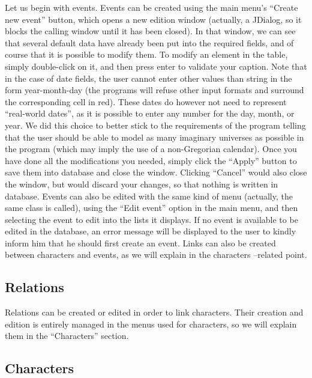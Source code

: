 \documentclass[a4paper ,12pt,french]{article}
\begin{document}
Let us begin with events. 
Events can be created using the main menu’s “Create new event” button, which opens a new edition window (actually, a JDialog, so it blocks the calling window until it has been closed). In that window, we can see that several default data have already been put into the required fields, and of course that it is possible to modify them. To modify an element in the table, simply double-click on it, and then press enter to validate your caption. Note that in the case of date fields, the user cannot enter other values than string in the form year-month-day (the programs will refuse other input formats and surround the corresponding cell in red). These dates do however not need to represent “real-world dates”, as it is possible to enter any number for the day, month, or year. We did this choice to better stick to the requirements of the program telling that the user should be able to model as many imaginary universes as possible in the program (which may imply the use of a non-Gregorian calendar). Once you have done all the modifications you needed, simply click the “Apply” button to save them into database and close the window. Clicking “Cancel” would also close the window, but would discard your changes, so that nothing is written in database.
Events can also be edited with the same kind of menu (actually, the same class is called), using the “Edit event” option in the main menu, and then selecting the event to edit into the lists it displays. If no event is available to be edited in the database, an error message will be displayed to the user to kindly inform him that he should first create an event.
Links can also be created between characters and events, as we will explain in the characters –related point.

\subsection*{Relations}

Relations can be created or edited in order to link characters. Their creation and edition is entirely managed in the menus used for characters, so we will explain them in the “Characters” section.

\subsection{Characters}
\end{document}
